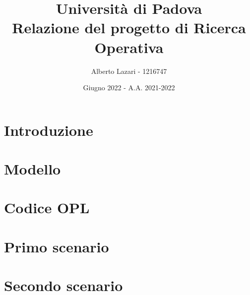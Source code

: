 \documentclass[12pt]{article}
\title{\textbf{Università di Padova \\ Relazione del progetto di Ricerca Operativa}}
\author{Alberto Lazari - 1216747}
\date{Giugno 2022 - A.A. 2021-2022}
\begin{document}
	\maketitle
	\pagebreak

	\tableofcontents
	\pagebreak

	\section{Introduzione}
	

	\section{Modello}
	
	\pagebreak

	\section{Codice OPL}
	

	\section{Primo scenario}
	

	\section{Secondo scenario}
	
\end{document}
